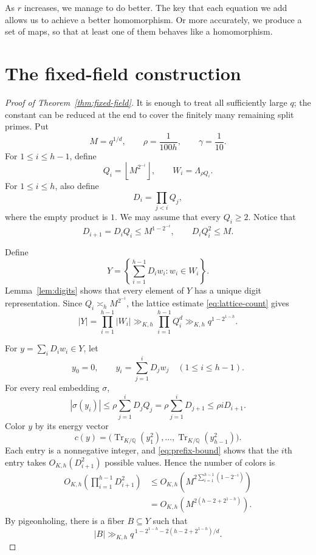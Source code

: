 \documentclass[11pt]{article}
\theoremstyle{plain}
\theoremstyle{remark}
\newcommand{\Q}{\mathbb Q}
\newcommand{\Tr}{\operatorname{Tr}_{K/\Q}}
\begin{document}
As $r$ increases, we manage to do better. The key that each equation we add allows us to achieve a better homomorphism. Or more accurately, we produce a set of maps, so that at least one of them behaves like a homomorphism.


\section{The fixed-field construction}

\begin{proof}[Proof of Theorem~\ref{thm:fixed-field}]
It is enough to treat all sufficiently large $q$; the constant can be reduced
at the end to cover the finitely many remaining split primes.  Put
\[
  M=q^{1/d},
  \qquad
  \rho=\frac1{100h},
  \qquad
  \gamma=\frac1{10}.
\]
For $1\leq i\leq h-1$, define
\[
  Q_i=\left\lfloor M^{2^{-i}}\right\rfloor,
  \qquad
  W_i=\Lambda_{\rho Q_i}.
\]
For $1\leq i\leq h$, also define
\[
  D_i=\prod_{j<i}Q_j,
\]
where the empty product is $1$.
We may assume that every $Q_i\geq2$.  Notice that
\begin{equation}\label{eq:scales}
  D_{i+1}=D_iQ_i\leq M^{1-2^{-i}},
  \qquad
  D_iQ_i^2\leq M.
\end{equation}

Define
\[
  Y=\left\{\sum_{i=1}^{h-1}D_iw_i:w_i\in W_i\right\}.
\]
Lemma~\ref{lem:digits} shows that every element of $Y$ has a unique digit
representation.  Since $Q_i\asymp_h M^{2^{-i}}$, the lattice estimate
\eqref{eq:lattice-count} gives
\begin{equation}\label{eq:Y-size}
  |Y|
  =\prod_{i=1}^{h-1}|W_i|
  \gg_{K,h}\prod_{i=1}^{h-1}Q_i^d
  \gg_{K,h}q^{1-2^{1-h}}.
\end{equation}

For $y=\sum_iD_iw_i\in Y$, let
\[
  y_0=0,
  \qquad
  y_i=\sum_{j=1}^iD_jw_j
  \quad(1\leq i\leq h-1).
\]
For every real embedding $\sigma$,
\begin{equation}\label{eq:prefix-bound}
  |\sigma(y_i)|
  \leq\rho\sum_{j=1}^iD_jQ_j
  =\rho\sum_{j=1}^iD_{j+1}
  \leq\rho iD_{i+1}.
\end{equation}
Color $y$ by its energy vector
\[
  c(y)=\bigl(\Tr(y_1^2),\ldots,\Tr(y_{h-1}^2)\bigr).
\]
Each entry is a nonnegative integer, and \eqref{eq:prefix-bound} shows that
the $i$th entry takes $O_{K,h}(D_{i+1}^2)$ possible values.  Hence the number
of colors is
\begin{align*}
  O_{K,h}\left(\prod_{i=1}^{h-1}D_{i+1}^2\right)
  &\leq O_{K,h}\left(
    M^{2\sum_{i=1}^{h-1}(1-2^{-i})}\right)\\
  &=O_{K,h}\left(M^{2(h-2+2^{1-h})}\right).
\end{align*}
By pigeonholing, there is a fiber $B\subseteq Y$ such that
\begin{equation}\label{eq:B-size}
  |B|
  \gg_{K,h}
  q^{\,1-2^{1-h}-2(h-2+2^{1-h})/d}.
\end{equation}


\end{proof}
\end{document}
